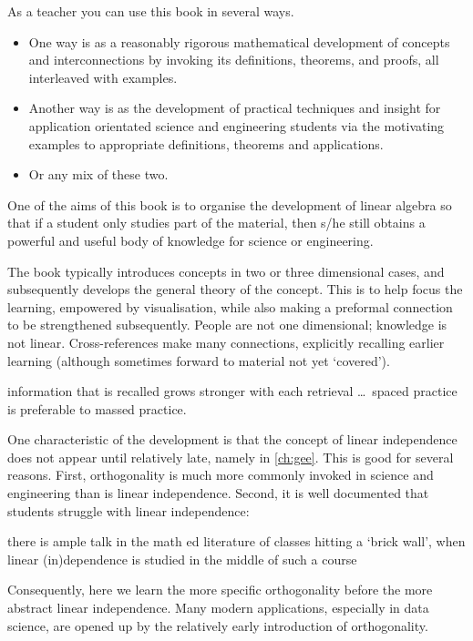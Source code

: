 As a teacher you can use this book in several ways.
\begin{itemize}
\item One way is as a reasonably rigorous mathematical development of concepts and interconnections by invoking its definitions, theorems, and proofs, all interleaved with examples.
\item Another way is as the development of practical techniques and insight for application orientated science and engineering students via the motivating examples to appropriate definitions, theorems and applications. 
\item Or any mix of these two.
\end{itemize}

One of the aims of this book is to organise the development of linear algebra so that if a student only studies part of the material, then s/he still obtains a powerful and useful body of knowledge for science or engineering.

The book typically introduces concepts in two or three dimensional cases, and subsequently develops the general theory of the concept.  
This is to help focus the learning, empowered by visualisation, while also making a preformal connection to be strengthened subsequently.
People are not one dimensional; knowledge is not linear.
Cross-references make many connections, explicitly recalling earlier learning (although sometimes forward to material not yet `covered').
\begin{quoted}{\cite{Halpern2003}}%
information that is recalled grows stronger with each retrieval \ldots\ spaced practice is preferable to massed practice.
\end{quoted}

One characteristic of the development is that the concept of linear independence does not appear until relatively late, namely in \cref{ch:gee}.
This is good for several reasons.
First, orthogonality is much more commonly invoked in science and engineering than is linear independence.
Second, it is well documented that students struggle with linear independence:
\begin{quoted}{\cite{Uhlig02}}
there is ample talk in the math ed literature of classes hitting a `brick wall', when linear (in)dependence is studied in the middle of such a course
\end{quoted}
Consequently, here we learn the more specific orthogonality before the more abstract linear independence.
Many modern applications, especially in data science, are opened up by the relatively early introduction of orthogonality.

